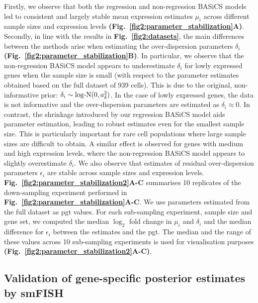 Firstly, we observe that both the regression and non-regression BASiCS models led to consistent and largely stable mean expression estimates $\mu_i$ across different sample sizes and expression levels \textbf{(Fig.~\ref{fig2:parameter_stabilization}A)}. Secondly, in line with the results in \textbf{Fig.~\ref{fig2:datasets}}, the main differences between the methods arise when estimating the over-dispersion parameters $\delta_i$ \textbf{(Fig.~\ref{fig2:parameter_stabilization}B)}. In particular, we observe that the non-regression BASiCS model appears to underestimate $\delta_i$ for lowly expressed genes when the sample size is small (with respect to the parameter estimates obtained based on the full dataset of 939 cells). This is due to the original, non-informative prior: $\delta_i\sim\textnormal{log-N}(0,a_\delta^2)$. In the case of lowly expressed genes, the data is not informative and the over-dispersion parameters are estimated as $\delta_i\approx{}0$. In contrast, the shrinkage introduced by our regression BASiCS model aids parameter estimation, leading to robust estimates even for the smallest sample size. This is particularly important for rare cell populations where large sample sizes are difficult to obtain. A similar effect is observed for genes with medium and high expression levels, where the non-regression BASiCS model appears to slightly overestimate $\delta_i$. We also observe that estimates of residual over-dispersion parameters $\epsilon_i$ are stable across sample sizes and expression levels. \textbf{Fig.~\ref{fig2:parameter_stabilization2}A-C} summarises 10 replicates of the down-sampling experiment performed in \textbf{Fig.~\ref{fig2:parameter_stabilization}A-C}. We use parameters estimated from the full dataset as \gls{pgt} values. For each sub-sampling experiment, sample size and gene set, we computed the median $\log_2$ fold change in $\mu_i$ and $\delta_i$ and the median difference for $\epsilon_i$ between the estimates and the \gls{pgt}. The median and the range of these values across 10 sub-sampling experiments is used for visualisation purposes \textbf{(Fig.~\ref{fig2:parameter_stabilization2}A-C)}. 

\subsection{Validation of gene-specific posterior estimates by smFISH}

